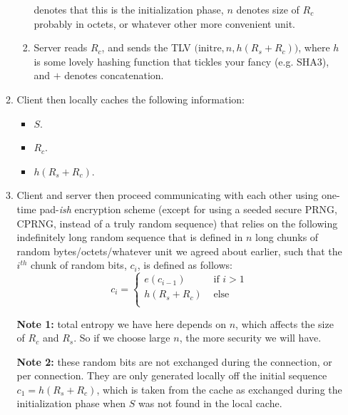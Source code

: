 \documentclass{article}
\begin{document}
\begin{enumerate}
\begin{enumerate}
\begin{enumerate}
                    denotes that this is the initialization phase, $n$ denotes
                    size of $R_c$ probably in octets, or whatever other more
                    convenient unit.
                    \item Server reads $R_c$, and sends the TLV
                    $\big(\text{initre}, n, h(R_s + R_c)\big)$, where $h$ is
                    some lovely hashing function that tickles your fancy (e.g.
                    SHA3), and $+$ denotes concatenation.
                \end{enumerate}
            \item Client then locally caches the following information:
                \begin{itemize}
                    \item $S$.
                    \item $R_c$.
                    \item $h(R_s + R_c)$.
                \end{itemize}
            \item Client and server then proceed communicating with each other
            using one-time pad-\emph{ish} encryption scheme (except for using a
            seeded secure PRNG, CPRNG, instead of a truly random sequence) that
            relies on the following indefinitely long random sequence that is
            defined in $n$ long chunks of random bytes/octets/whatever unit we
            agreed about earlier, such that the $i^{th}$ chunk of random bits,
            $c_i$, is defined as follows:
            \begin{equation}
                c_i = 
                \begin{cases}
                    e(c_{i-1}) & \text{ if } i > 1\\
                    h(R_s + R_c) & \text{ else}\\
                \end{cases}
            \end{equation}

            \textbf{Note 1:} total entropy we have here depends on $n$, which
            affects the size of $R_c$ and $R_s$. So if we choose large $n$, the
            more security we will have.

            \textbf{Note 2:} these random bits are not exchanged during the
            connection, or per connection. They are only generated locally off
            the initial sequence $c_1 = h(R_s + R_c)$, which is taken from the
            cache as exchanged during the initialization phase when $S$ was not
            found in the local cache.


\end{enumerate}
\end{enumerate}
\end{document}

